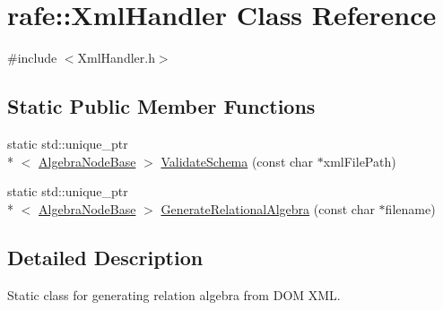 \hypertarget{classrafe_1_1_xml_handler}{\section{rafe\+:\+:Xml\+Handler Class Reference}
\label{classrafe_1_1_xml_handler}
}


{\ttfamily \#include $<$Xml\+Handler.\+h$>$}

\subsection*{Static Public Member Functions}
\begin{DoxyCompactItemize}
\item 
static std\+::unique\+\_\+ptr\\*
$<$ \hyperlink{classrafe_1_1_algebra_node_base}{Algebra\+Node\+Base} $>$ \hyperlink{classrafe_1_1_xml_handler_ab1edfc4be74e2553cfa96bbc92ad91c3}{Validate\+Schema} (const char $\ast$xml\+File\+Path)
\item 
static std\+::unique\+\_\+ptr\\*
$<$ \hyperlink{classrafe_1_1_algebra_node_base}{Algebra\+Node\+Base} $>$ \hyperlink{classrafe_1_1_xml_handler_a4045f6c818eb92e84fc902f3057717a7}{Generate\+Relational\+Algebra} (const char $\ast$filename)
\end{DoxyCompactItemize}


\subsection{Detailed Description}
Static class for generating relation algebra from D\+O\+M X\+M\+L. 

